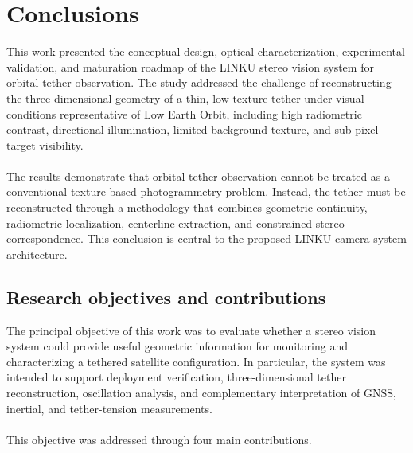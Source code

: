 \chapter{Conclusions}

This work presented the conceptual design, optical characterization, experimental validation, and maturation roadmap of the LINKU stereo vision system for orbital tether observation. The study addressed the challenge of reconstructing the three-dimensional geometry of a thin, low-texture tether under visual conditions representative of Low Earth Orbit, including high radiometric contrast, directional illumination, limited background texture, and sub-pixel target visibility.
\\\\
The results demonstrate that orbital tether observation cannot be treated as a conventional texture-based photogrammetry problem. Instead, the tether must be reconstructed through a methodology that combines geometric continuity, radiometric localization, centerline extraction, and constrained stereo correspondence. This conclusion is central to the proposed LINKU camera system architecture.

\section{Research objectives and contributions}

The principal objective of this work was to evaluate whether a stereo vision system could provide useful geometric information for monitoring and characterizing a tethered satellite configuration. In particular, the system was intended to support deployment verification, three-dimensional tether reconstruction, oscillation analysis, and complementary interpretation of GNSS, inertial, and tether-tension measurements.
\\\\
This objective was addressed through four main contributions.

